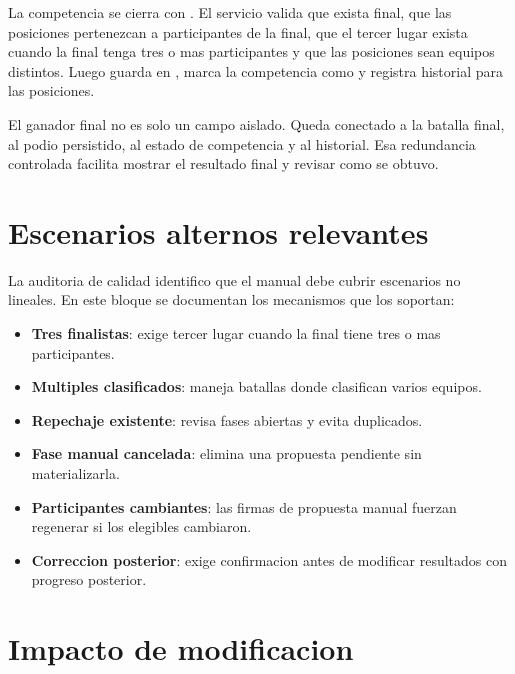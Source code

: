 La competencia se cierra con . El servicio valida que exista final, que las posiciones pertenezcan a participantes de la final, que el tercer lugar exista cuando la final tenga tres o mas participantes y que las posiciones sean equipos distintos. Luego guarda  en , marca la competencia como  y registra historial para las posiciones.

El ganador final no es solo un campo aislado. Queda conectado a la batalla final, al podio persistido, al estado de competencia y al historial. Esa redundancia controlada facilita mostrar el resultado final y revisar como se obtuvo.

\section{Escenarios alternos relevantes}
\label{sec:flujo-escenarios-alternos}

La auditoria de calidad identifico que el manual debe cubrir escenarios no lineales. En este bloque se documentan los mecanismos que los soportan:

\begin{itemize}
  \item \textbf{Tres finalistas}:  exige tercer lugar cuando la final tiene tres o mas participantes.
  \item \textbf{Multiples clasificados}:  maneja batallas donde clasifican varios equipos.
  \item \textbf{Repechaje existente}:  revisa fases abiertas y evita duplicados.
  \item \textbf{Fase manual cancelada}:  elimina una propuesta pendiente sin materializarla.
  \item \textbf{Participantes cambiantes}: las firmas de propuesta manual fuerzan regenerar si los elegibles cambiaron.
  \item \textbf{Correccion posterior}:  exige confirmacion antes de modificar resultados con progreso posterior.
\end{itemize}

\section{Impacto de modificacion}
\label{sec:flujo-impacto-modificacion}

